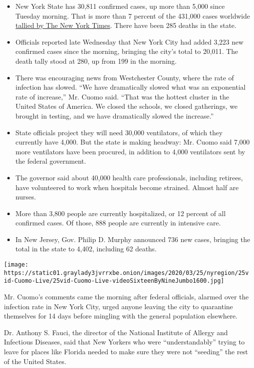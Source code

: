 \begin{itemize}
\item
  New York State has 30,811 confirmed cases, up more than 5,000 since
  Tuesday morning. That is more than 7 percent of the 431,000 cases
  worldwide
  \href{https://www.nytimes3xbfgragh.onion/interactive/2020/world/coronavirus-maps.html\#us}{tallied
  by The New York Times}. There have been 285 deaths in the state.
\item
  Officials reported late Wednesday that New York City had added 3,223
  new confirmed cases since the morning, bringing the city's total to
  20,011. The death tally stood at 280, up from 199 in the morning.
\item
  There was encouraging news from Westchester County, where the rate of
  infection has slowed. ``We have dramatically slowed what was an
  exponential rate of increase,'' Mr. Cuomo said. ``That was the hottest
  cluster in the United States of America. We closed the schools, we
  closed gatherings, we brought in testing, and we have dramatically
  slowed the increase.''
\item
  State officials project they will need 30,000 ventilators, of which
  they currently have 4,000. But the state is making headway: Mr. Cuomo
  said 7,000 more ventilators have been procured, in addition to 4,000
  ventilators sent by the federal government.
\item
  The governor said about 40,000 health care professionals, including
  retirees, have volunteered to work when hospitals become strained.
  Almost half are nurses.
\item
  More than 3,800 people are currently hospitalized, or 12 percent of
  all confirmed cases. Of those, 888 people are currently in intensive
  care.
\item
  In New Jersey, Gov. Philip D. Murphy announced 736 new cases, bringing
  the total in the state to 4,402, including 62 deaths.
\end{itemize}

\texttt{[image: https://static01.graylady3jvrrxbe.onion/images/2020/03/25/nyregion/25vid-Cuomo-Live/25vid-Cuomo-Live-videoSixteenByNineJumbo1600.jpg]}

Mr. Cuomo's comments came the morning after federal officials, alarmed
over the infection rate in New York City, urged anyone leaving the city
to quarantine themselves for 14 days before mingling with the general
population elsewhere.

Dr. Anthony S. Fauci, the director of the National Institute of Allergy
and Infectious Diseases, said that New Yorkers who were
``understandably'' trying to leave for places like Florida needed to
make sure they were not ``seeding'' the rest of the United States.

